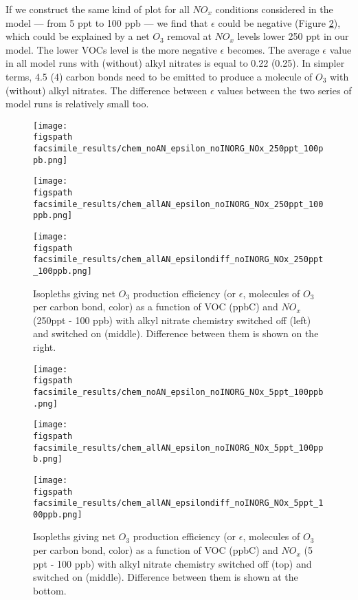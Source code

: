 \documentclass[11pt,a4paper]{article}
\newcommand{\figspath}{figures/}
\begin{document}
If we construct the same kind of plot for all $NO_x$ conditions considered in the model --- from 5 ppt to 100 ppb --- we find that $\epsilon$ could be negative (Figure \ref{fig:epsilon5ppt100ppb}), which could be explained by a net $O_3$ removal at $NO_x$ levels lower 250 ppt in our model. The lower VOCs level is the more negative $\epsilon$ becomes. The average $\epsilon$ value in all model runs with (without) alkyl nitrates is equal to 0.22 (0.25). In simpler terms, 4.5 (4) carbon bonds need to be emitted to produce a molecule of $O_3$ with (without) alkyl nitrates. The difference between $\epsilon$ values between the two series of model runs is relatively small too.

\begin{figure} %
\centering
\begin{minipage}{.5\textwidth}
  \centering
  \texttt{[image: \\figspath facsimile\_results/chem\_noAN\_epsilon\_noINORG\_NOx\_250ppt\_100ppb.png]}
\end{minipage}
\begin{minipage}{.5\textwidth}
  \centering
  \texttt{[image: \\figspath facsimile\_results/chem\_allAN\_epsilon\_noINORG\_NOx\_250ppt\_100ppb.png]}
\end{minipage}
\begin{minipage}{.5\textwidth}
  \centering
  \texttt{[image: \\figspath facsimile\_results/chem\_allAN\_epsilondiff\_noINORG\_NOx\_250ppt\_100ppb.png]}
\end{minipage}
\caption{Isopleths giving net $O_3$ production efficiency (or $\epsilon$, molecules of $O_3$ per carbon bond, color) as a function of VOC (ppbC) and $NO_x$ (250ppt - 100 ppb) with alkyl nitrate chemistry switched off (left) and switched on (middle). Difference between them is shown on the right.}
\label{fig:epsilon250ppt100ppb}
\end{figure}

\begin{figure} %
\centering
\begin{minipage}{.5\textwidth}
  \centering
  \texttt{[image: \\figspath facsimile\_results/chem\_noAN\_epsilon\_noINORG\_NOx\_5ppt\_100ppb.png]}
\end{minipage}
\begin{minipage}{.5\textwidth}
  \centering
  \texttt{[image: \\figspath facsimile\_results/chem\_allAN\_epsilon\_noINORG\_NOx\_5ppt\_100ppb.png]}
\end{minipage}
\begin{minipage}{.5\textwidth}
  \centering
  \texttt{[image: \\figspath facsimile\_results/chem\_allAN\_epsilondiff\_noINORG\_NOx\_5ppt\_100ppb.png]}
\end{minipage}
\caption{Isopleths giving net $O_3$ production efficiency (or $\epsilon$, molecules of $O_3$ per carbon bond, color) as a function of VOC (ppbC) and $NO_x$ (5 ppt - 100 ppb) with alkyl nitrate chemistry switched off (top) and switched on (middle). Difference between them is shown at the bottom.}
\label{fig:epsilon5ppt100ppb}
\end{figure}
\end{document}
